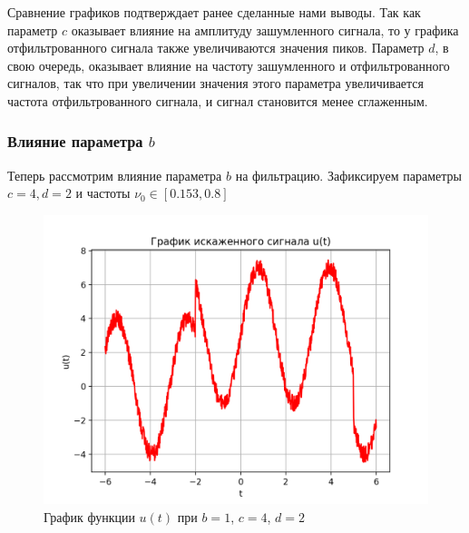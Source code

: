 Сравнение графиков подтверждает ранее сделанные нами выводы. Так как параметр $c$ оказывает влияние на амплитуду зашумленного сигнала, то у графика отфильтрованного сигнала также увеличиваются значения пиков. Параметр $d$, в свою очередь, оказывает влияние на частоту зашумленного и отфильтрованного сигналов, так что при увеличении значения этого параметра увеличивается частота отфильтрованного сигнала, и сигнал становится менее сглаженным.

\subsubsection{Влияние параметра $b$}\label{b_ex}

Теперь рассмотрим влияние параметра $b$ на фильтрацию. Зафиксируем параметры $c=4, d=2$ и частоты  $\nu_0 \in [0.153, 0.8]$

\begin{figure}[ht!]
    \centering
    \includegraphics[scale=0.75]{media/1 task/specific_freq/Noisy_1_4_2.png}
    \caption{График функции $u(t)$ при $b=1$,  $c=4$,  $d=2$}
    \label{fig:noisy_1_4_2}
\end{figure}


